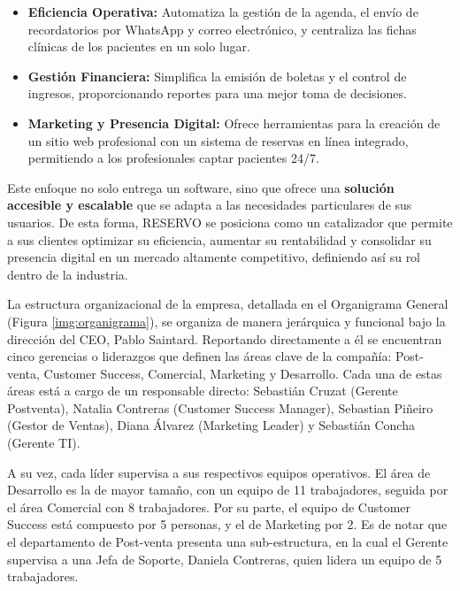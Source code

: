 \begin{itemize}
    \item \textbf{Eficiencia Operativa:} Automatiza la gestión de la agenda, el envío de recordatorios por WhatsApp y correo electrónico, y centraliza las fichas clínicas de los pacientes en un solo lugar.
    
    \item \textbf{Gestión Financiera:} Simplifica la emisión de boletas y el control de ingresos, proporcionando reportes para una mejor toma de decisiones.
    
    \item \textbf{Marketing y Presencia Digital:} Ofrece herramientas para la creación de un sitio web profesional con un sistema de reservas en línea integrado, permitiendo a los profesionales captar pacientes 24/7.
\end{itemize}

Este enfoque no solo entrega un software, sino que ofrece una \textbf{solución accesible y escalable} que se adapta a las necesidades particulares de sus usuarios. De esta forma, RESERVO se posiciona como un catalizador que permite a sus clientes optimizar su eficiencia, aumentar su rentabilidad y consolidar su presencia digital en un mercado altamente competitivo, definiendo así su rol dentro de la industria.

La estructura organizacional de la empresa, detallada en el Organigrama General (Figura \ref{img:organigrama}), se organiza de manera jerárquica y funcional bajo la dirección del CEO, Pablo Saintard. Reportando directamente a él se encuentran cinco gerencias o liderazgos que definen las áreas clave de la compañía: Post-venta, Customer Success, Comercial, Marketing y Desarrollo. Cada una de estas áreas está a cargo de un responsable directo: Sebastián Cruzat (Gerente Postventa), Natalia Contreras (Customer Success Manager), Sebastian Piñeiro (Gestor de Ventas), Diana Álvarez (Marketing Leader) y Sebastián Concha (Gerente TI).

A su vez, cada líder supervisa a sus respectivos equipos operativos. El área de Desarrollo es la de mayor tamaño, con un equipo de 11 trabajadores, seguida por el área Comercial con 8 trabajadores. Por su parte, el equipo de Customer Success está compuesto por 5 personas, y el de Marketing por 2. Es de notar que el departamento de Post-venta presenta una sub-estructura, en la cual el Gerente supervisa a una Jefa de Soporte, Daniela Contreras, quien lidera un equipo de 5 trabajadores.

